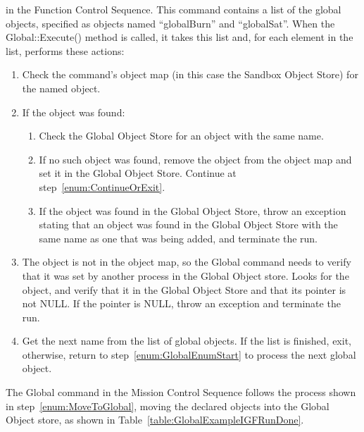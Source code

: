 \noindent in the Function Control Sequence.  This command contains a list of the global objects,
specified as objects named ``globalBurn'' and ``globalSat''.  When the Global::\-Execute() method is
called, it takes this list and, for each element in the list, performs these actions:

\begin{enumerate}
\item\label{enum:GlobalEnumStart} Check the command's object map (in this case the Sandbox Object
Store) for the named object. 
\item If the object was found:
\begin{enumerate}
\item Check the Global Object Store for an object with the same name.
\item\label{enum:MoveToGlobal} If no such object was found, remove the object from the object map
and set it in the Global Object Store.  Continue at step~\ref{enum:ContinueOrExit}.
\item If the object was found in the Global Object Store, throw an exception stating that an object
was found in the Global Object Store with the same name as one that was being added, and terminate
the run.
\end{enumerate}
\item The object is not in the object map, so the Global command needs to verify that it was set by
another process in the Global Object store.  Looks for the object, and verify that it in the Global
Object Store and that its pointer is not NULL.  If the pointer is NULL, throw an exception and
terminate the run.
\item\label{enum:ContinueOrExit} Get the next name from the list of global objects.  If the list is
finished, exit, otherwise, return to step~\ref{enum:GlobalEnumStart} to process the next global
object.
\end{enumerate}

The Global command in the Mission Control Sequence follows the process shown in
step~\ref{enum:MoveToGlobal}, moving the declared objects into the Global Object store, as shown in
Table~\ref{table:GlobalExampleIGFRunDone}.

